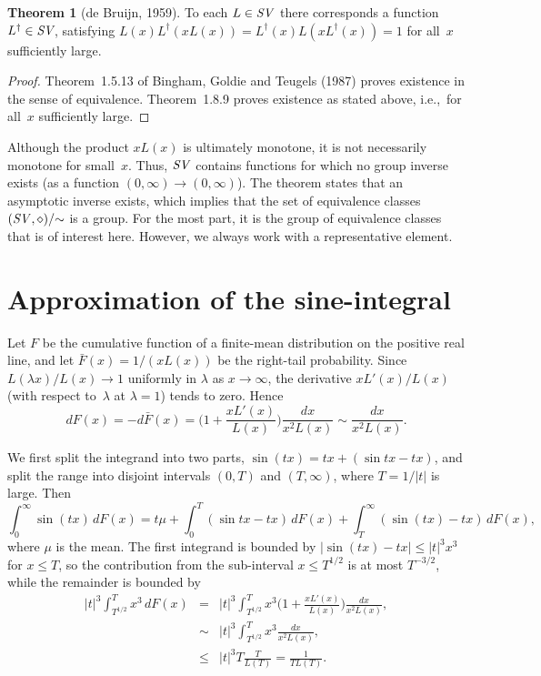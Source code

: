 \documentclass[11pt]{article}
\theoremstyle{definition}
\newtheorem{theorem}{Theorem}[section]
\def\SV{\mathop{\it SV}\nolimits}
\begin{document}
\begin{appendix}
	\begin{theorem}[de Bruijn, 1959]
		To each $L\in\SV$ there corresponds a function $L^\dagger \in \SV\!$, 
		satisfying $L(x) L^\dagger(x L(x)) = L^\dagger(x) L(xL^\dagger(x)) = 1$ for all~$x$ sufficiently large.
	\end{theorem}
	
	
	\begin{proof}
		Theorem~1.5.13 of Bingham, Goldie and Teugels (1987) proves existence in the sense of equivalence.
		Theorem~1.8.9 proves existence as stated above, i.e.,~for all~$x$ sufficiently large.
	\end{proof}
	
	Although the product $xL(x)$ is ultimately monotone, it is not necessarily monotone for small~$x$.
	Thus, $\SV$ contains functions for which no group inverse exists (as a function $(0,\infty) \to (0,\infty)$).
	The theorem states that an asymptotic inverse exists, which implies that the set of equivalence classes
	$(\SV, \diamond)/{\sim}$ is a group.
	For the most part, it is the group of equivalence classes that is of interest here.
	However, we always work with a representative element.
	
	\section{Approximation of the sine-integral}\label{appSinIntegral}
	Let $F$ be the cumulative function of a finite-mean distribution on the positive real line, 
	and let $\bar F(x) = 1/(x L(x))$ be the right-tail probability.
	Since $L(\lambda x)/L(x) \to 1$ uniformly in $\lambda$ as $x\to\infty$, the derivative $x L'(x)/L(x)$ 
	(with respect to~$\lambda$ at $\lambda=1$) tends to zero.
	Hence
	\[
	dF(x) = - d\bar F(x) = \biggl(1 + \frac{xL'(x)} {L(x)} \biggr) \frac{dx} {x^2 L(x)} \sim \frac{dx} {x^2 L(x)}.
	\]
	
	We first split the integrand into two parts, $\sin(tx) = t x + (\sin t x - t x)$,
	and split the range into disjoint intervals $(0, T)$ and $(T, \infty)$, where $T = 1/|t|$ is large.
	Then
	\begin{equation}\label{split_integral}
	\int_0^\infty\!\! \sin(tx)\, dF(x) = t \mu + \int_0^T\!\! (\sin t x - tx)\, dF(x) + \int_T^\infty\!\! (\sin(tx) - tx) \, dF(x),
	\end{equation}
	where $\mu$ is the mean.
	The first integrand is bounded by $|\sin(tx) - tx| \le |t|^3 x^3$ for $x \le T$, so the contribution from the sub-interval
    $x \le T^{1/2}$ is at most $T^{-3/2}$, while the remainder is bounded by
	\begin{eqnarray*}
		|t|^3 \int_{T^{1/2}}^T x^3\, dF(x) &=& |t|^3 \int_{T^{1/2}}^T x^3 \Big(1 + \frac{x L'(x)} {L(x)} \Bigr)\frac{dx} {x^2 L(x)} , \\
		&\sim& |t|^3 \int_{T^{1/2}}^T x^3 \frac{dx} {x^2 L(x)} , \\
		& \le & |t|^3 T \frac T {L(T)} = \frac 1 {T L(T)}.
	\end{eqnarray*}


\end{appendix}
\end{document}
